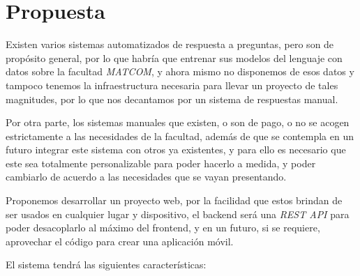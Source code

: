 \chapter{Propuesta}\label{chapter:proposal}

Existen varios sistemas automatizados de respuesta a preguntas, pero son de propósito general, por lo que habría que entrenar sus modelos del lenguaje con datos sobre la facultad \textit{MATCOM}, y ahora mismo no disponemos de esos datos y tampoco tenemos la infraestructura necesaria para llevar un proyecto de tales magnitudes, por lo que nos decantamos por un sistema de respuestas manual.
\newline

Por otra parte, los sistemas manuales que existen, o son de pago, o no se acogen estrictamente a las necesidades de la facultad, además de que se contempla en un futuro integrar este sistema con otros ya existentes, y para ello es necesario que este sea totalmente personalizable para poder hacerlo a medida, y poder cambiarlo de acuerdo a las necesidades que se vayan presentando.
\newline

Proponemos desarrollar un proyecto web, por la facilidad que estos brindan de ser usados en cualquier lugar y dispositivo, el backend será una \textit{REST API} para poder desacoplarlo al máximo del frontend, y en un futuro, si se requiere, aprovechar el código para crear una aplicación móvil.
\newline

El sistema tendrá las siguientes características:
\newline

